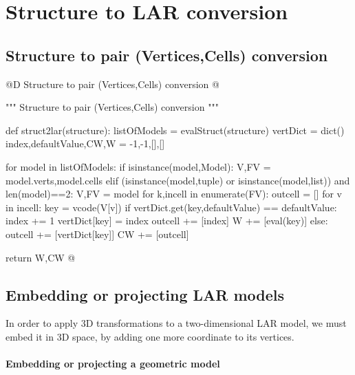 \documentclass[11pt,oneside]{article}    %
\begin{document}
\section{Structure to LAR conversion}


\subsection{Structure to pair (Vertices,Cells) conversion}
@D Structure to pair (Vertices,Cells) conversion
@{""" Structure to pair (Vertices,Cells) conversion """

def struct2lar(structure):
    listOfModels = evalStruct(structure)
    vertDict = dict()
    index,defaultValue,CW,W = -1,-1,[],[]
        
    for model in listOfModels:
        if isinstance(model,Model):
            V,FV = model.verts,model.cells
        elif (isinstance(model,tuple) or isinstance(model,list)) and len(model)==2:
            V,FV = model
        for k,incell in enumerate(FV):
            outcell = []
            for v in incell:
                key = vcode(V[v])
                if vertDict.get(key,defaultValue) == defaultValue:
                    index += 1
                    vertDict[key] = index
                    outcell += [index]
                    W += [eval(key)]
                else: 
                    outcell += [vertDict[key]]
            CW += [outcell]
            
    return W,CW
@}
\subsection{Embedding or projecting LAR models}

In order to apply 3D transformations to a two-dimensional LAR model, we must embed it in 3D space, by adding one more coordinate to its vertices. 

\paragraph{Embedding or projecting a geometric model}
\end{document}
